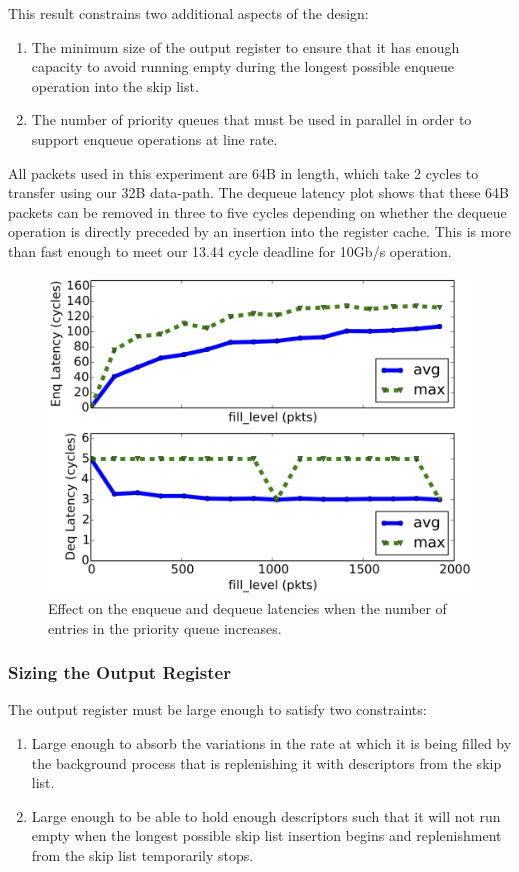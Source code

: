 This result constrains two additional aspects of the design:
\begin{enumerate}
  \item The minimum size of the output register to ensure that it has enough capacity to avoid running empty during the longest possible enqueue operation into the skip list.
    \item The number of priority queues that must be used in parallel in order to support enqueue operations at line rate.
\end{enumerate}

All packets used in this experiment are 64B in length, which take 2 cycles to transfer using our 32B data-path. The dequeue latency plot shows that these 64B packets can be removed in three to five cycles depending on whether the dequeue operation is directly preceded by an insertion into the register cache. This is more than fast enough to meet our 13.44 cycle deadline for 10Gb/s operation.

\begin{figure}[!h]
\includegraphics[width=1\linewidth]{figures/eval/enq_deq_v_fill_level}
\caption{Effect on the enqueue and dequeue latencies when the number of entries in the priority queue increases.}
\label{fig:fill_level}
\end{figure}

\subsubsection*{Sizing the Output Register}
The output register must be large enough to satisfy two constraints:
\begin{enumerate}
  \item Large enough to absorb the variations in the rate at which it is being filled by the background process that is replenishing it with descriptors from the skip list.
  \item Large enough to be able to hold enough descriptors such that it will not run empty when the longest possible skip list insertion begins and replenishment from the skip list temporarily stops.
\end{enumerate}

